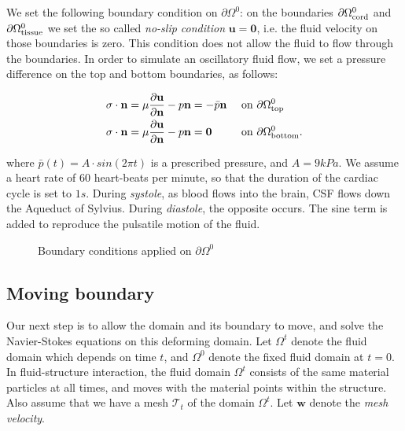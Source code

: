 \documentclass[a4paper,11pt,openright,twoside]{book}
\newcommand{\mesh}{\mathcal{T}_t}
\begin{document}
We set the following boundary condition on $\partial \Omega^0$: on the boundaries $\partial \Omega_{\rm cord}^0$ and $\partial \Omega_{\rm tissue}^0$ we set the so called \emph{no-slip condition} $\mathbf{u = 0}$, i.e. the fluid velocity on those boundaries is zero. This condition does not allow the fluid to flow through the boundaries.
In order to simulate an oscillatory fluid flow, we set a pressure difference on the top and bottom boundaries, as follows:

\begin{align}
\label{eq:bc:6}
\sigma \cdot \mathbf{n} &= \mu \frac{\partial \mathbf{u}}{\partial \mathbf{n}} - p \mathbf{n} = -\bar{p} \mathbf{n} && \text { on } \partial \Omega_{\rm top}^0 \\
\label{eq:bc:6bis}
\sigma \cdot \mathbf{n} &= \mu \frac{\partial \mathbf{u}}{\partial \mathbf{n}} - p \mathbf{n} = \mathbf{0}  && \text { on } \partial \Omega_{\rm bottom}^0.
\end{align}

where $\bar{p}(t) = A \cdot sin(2\pi t)$ is a prescribed pressure, and $A = 9kPa$. We assume a heart rate of $60$ heart-beats per minute, so that the duration of the cardiac cycle is set to $1s$. During \textit{systole}, as blood flows into the brain, CSF flows down the Aqueduct of Sylvius. During \textit{diastole}, the opposite occurs. The sine term is added to reproduce the pulsatile motion of the fluid. 

\begin{figure}


  \caption{Boundary conditions applied on $\partial \Omega^0$}
\end{figure}


\subsection{Moving boundary}
Our next step is to allow the domain and its boundary to move, and
solve the Navier-Stokes equations on this deforming domain. Let $\Omega^t$ denote the fluid domain which depends on time $t$, and
$\Omega^0$ denote the fixed fluid domain at $t = 0$. In
fluid-structure interaction, the fluid domain $\Omega^t$ consists of
the same material particles at all times, and moves with the material
points within the structure. Also assume that we have a mesh $\mesh$
of the domain $\Omega^t$. Let $\mathbf{w}$ denote the \emph{mesh velocity}.
  
\end{document}
